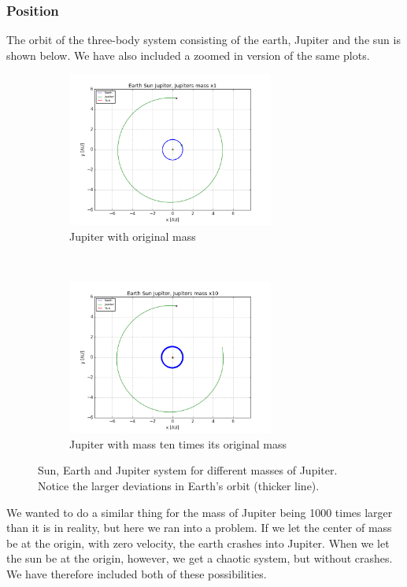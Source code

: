 \documentclass[a4paper, 10pt]{article}
\begin{document}
\subsubsection{Position}
The orbit of the three-body system consisting of the earth, Jupiter and the sun is shown below. We have also included a zoomed in version of the same plots.
\begin{figure}[!ht]
    \centering
    \begin{subfigure}[H!]{0.5\textwidth}
        \centering
        \includegraphics[height=2.0in]{orbitESJ1.png}
        \caption{Jupiter with original mass}
    \end{subfigure}%
    ~ 
    \begin{subfigure}[H!]{0.5\textwidth}
        \centering
        \includegraphics[height=2.0in]{orbitESJ10.png}
        \caption{Jupiter with mass ten times its original mass}
    \end{subfigure}
    \caption{Sun, Earth and Jupiter system for different masses of Jupiter. Notice the larger deviations in Earth's orbit (thicker line).} \label{fig:jupiter1-10}
\end{figure}
We wanted to do a similar thing for the mass of Jupiter being 1000 times larger than it is in reality, but here we ran into a problem. If we let the center of mass be at the origin, with zero velocity, the earth crashes into Jupiter. When we let the sun be at the origin, however, we get a chaotic system, but without crashes. We have therefore included both of these possibilities.
\end{document}
